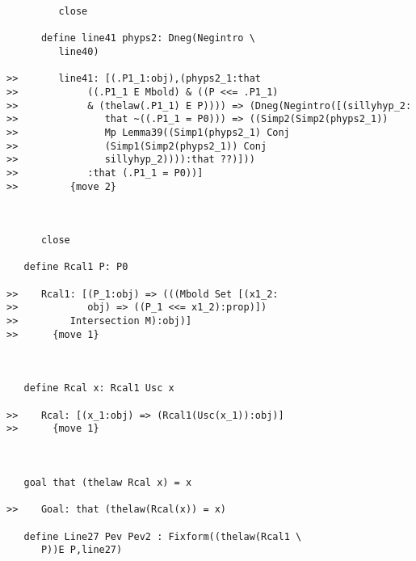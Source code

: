 \documentclass[12pt]{article}
\begin{document}
\begin{verbatim}
         close

      define line41 phyps2: Dneg(Negintro \
         line40)

>>       line41: [(.P1_1:obj),(phyps2_1:that
>>            ((.P1_1 E Mbold) & ((P <<= .P1_1)
>>            & (thelaw(.P1_1) E P)))) => (Dneg(Negintro([(sillyhyp_2:
>>               that ~((.P1_1 = P0))) => ((Simp2(Simp2(phyps2_1))
>>               Mp Lemma39((Simp1(phyps2_1) Conj
>>               (Simp1(Simp2(phyps2_1)) Conj
>>               sillyhyp_2)))):that ??)]))
>>            :that (.P1_1 = P0))]
>>         {move 2}



      close

   define Rcal1 P: P0

>>    Rcal1: [(P_1:obj) => (((Mbold Set [(x1_2:
>>            obj) => ((P_1 <<= x1_2):prop)])
>>         Intersection M):obj)]
>>      {move 1}



   define Rcal x: Rcal1 Usc x

>>    Rcal: [(x_1:obj) => (Rcal1(Usc(x_1)):obj)]
>>      {move 1}



   goal that (thelaw Rcal x) = x

>>    Goal: that (thelaw(Rcal(x)) = x)

   define Line27 Pev Pev2 : Fixform((thelaw(Rcal1 \
      P))E P,line27)


\end{verbatim}
\end{document}
